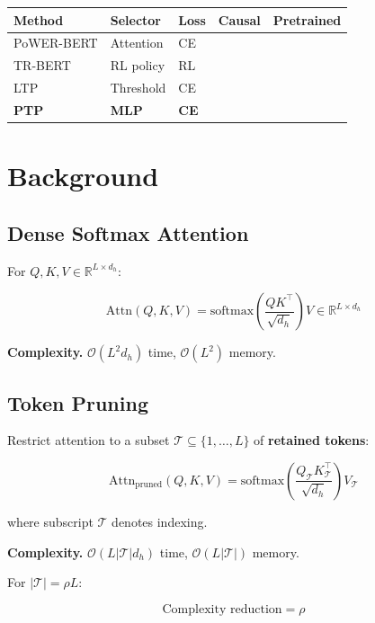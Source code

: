 {\begin{table}[H]
\centering
\small
\begin{tabular}{lllll}
\toprule
\textbf{Method} & \textbf{Selector} & \textbf{Loss} & \textbf{Causal} & \textbf{Pretrained} \\
\midrule
PoWER-BERT & Attention & CE &  &  \\
TR-BERT & RL policy & RL &  &  \\
LTP & Threshold & CE &  &  \\
\textbf{PTP} & \textbf{MLP} & \textbf{CE} & \textbf{ } & \textbf{ } \\
\bottomrule
\end{tabular}
\end{table}




\section{Background}

\subsection{Dense Softmax Attention}

For $Q, K, V \in \mathbb{R}^{L \times d_h}$:

\[
\text{Attn}(Q, K, V) = \text{softmax}\!\left(\frac{Q K^\top}{\sqrt{d_h}}\right) V \in \mathbb{R}^{L \times d_h}
\tag{3.1}
\]

\textbf{Complexity.} $\mathcal{O}(L^2 d_h)$ time, $\mathcal{O}(L^2)$ memory.

\subsection{Token Pruning}

Restrict attention to a subset $\mathcal{T} \subseteq \{1, \dots, L\}$ 
of \textbf{retained tokens}:

\[
\text{Attn}_\text{pruned}(Q, K, V) = \text{softmax}\!\left(\frac{Q_\mathcal{T} K_\mathcal{T}^\top}{\sqrt{d_h}}\right) V_\mathcal{T}
\tag{3.2}
\]

where subscript $\mathcal{T}$ denotes indexing.

\textbf{Complexity.} $\mathcal{O}(L |\mathcal{T}| d_h)$ time, $\mathcal{O}(L |\mathcal{T}|)$ memory.

For $|\mathcal{T}| = \rho L$:

\[
\text{Complexity reduction} = \rho
\tag{3.3}
\]

}
